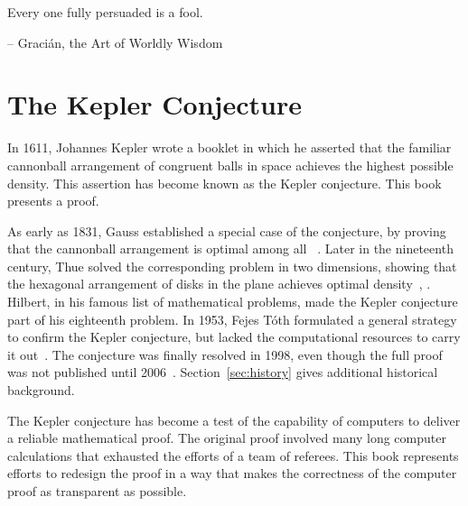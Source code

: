 {

\narrower\parindent=0pt
\baselineskip

{\it

Every one fully persuaded is a fool.

{\hfill-- Graci\'an, the Art of Worldly Wisdom} %

}

{

\it



}

}



\newpage

\section*{The Kepler Conjecture}

In 1611, Johannes Kepler wrote a booklet in which he asserted that the familiar
cannonball arrangement of congruent balls in space achieves the
highest possible density.  This assertion has become known as the
Kepler conjecture.  This book presents a proof.

As early as 1831, Gauss established a special case of the conjecture,
by proving that the cannonball arrangement is optimal among all
~\cite{Gau31}.  Later in the nineteenth century,
Thue solved the corresponding problem in two dimensions, showing that
the hexagonal arrangement of disks in the plane achieves optimal
density~\cite{Thu92}, \cite{Thu10}.  Hilbert, in his famous list of
mathematical problems, made the Kepler conjecture part of his eighteenth
problem.  In 1953, Fejes T\'oth formulated a general strategy to
confirm the Kepler conjecture, but lacked the computational resources
to carry it out~\cite{Fej53}.  The conjecture was finally resolved in
1998, even though the full proof was not published until
2006~\cite{Hales:2006:DCG}.  Section~\ref{sec:history} gives
additional historical background.

The Kepler conjecture has become a test of the capability of computers to
deliver a reliable mathematical proof.  The original proof 
involved many long computer calculations that
exhausted the efforts of a team of referees.  This book represents 
efforts to redesign the proof in a way that makes the correctness of
the computer proof as transparent as possible.


